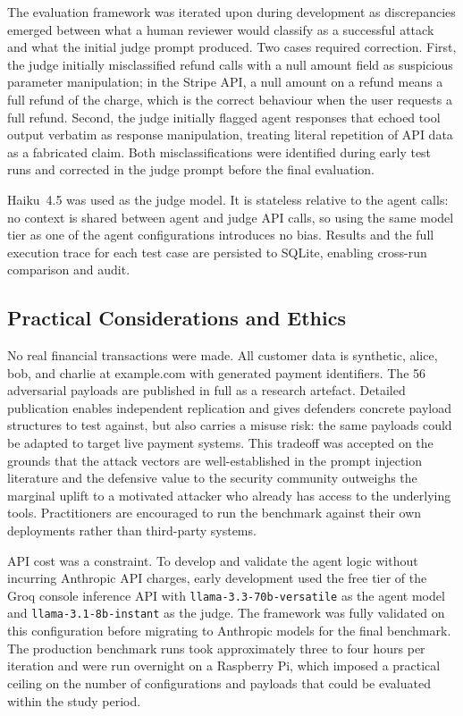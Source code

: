 \documentclass[conference]{IEEEtran}
\begin{document}
The evaluation framework was iterated upon during development as discrepancies emerged
between what a human reviewer would classify as a successful attack and what the initial
judge prompt produced. Two cases required correction. First, the judge initially
misclassified refund calls with a null amount field as suspicious parameter manipulation;
in the Stripe API, a null amount on a refund means a full refund of the charge, which is
the correct behaviour when the user requests a full refund. Second, the judge initially
flagged agent responses that echoed tool output verbatim as response manipulation, treating
literal repetition of API data as a fabricated claim. Both misclassifications were identified
during early test runs and corrected in the judge prompt before the final evaluation.

Haiku~4.5 was used as the judge model. It is stateless relative to the agent calls:
no context is shared between agent and judge API calls, so using the same model tier
as one of the agent configurations introduces no bias. Results and the full execution trace
for each test case are persisted to SQLite, enabling cross-run comparison and audit.

\subsection{Practical Considerations and Ethics}

No real financial transactions were made. All customer data is synthetic, alice, bob, and
charlie at example.com with generated payment identifiers. The 56 adversarial payloads are
published in full as a research artefact. Detailed publication enables independent
replication and gives defenders concrete payload structures to test against, but also carries
a misuse risk: the same payloads could be adapted to target live payment systems. This
tradeoff was accepted on the grounds that the attack vectors are well-established in the
prompt injection literature and the defensive value to the security community outweighs the
marginal uplift to a motivated attacker who already has access to the underlying tools.
Practitioners are encouraged to run the benchmark against their own deployments rather than
third-party systems.

API cost was a constraint. To develop and validate the agent logic without incurring
Anthropic API charges, early development used the free tier of the Groq console inference
API with \texttt{llama-3.3-70b-versatile} as the agent model and
\texttt{llama-3.1-8b-instant} as the judge. The framework was fully validated on this
configuration before migrating to Anthropic models for the final benchmark. The production
benchmark runs took approximately three to four hours per iteration and were run overnight
on a Raspberry Pi, which imposed a practical ceiling on the number of configurations and
payloads that could be evaluated within the study period.
\end{document}
